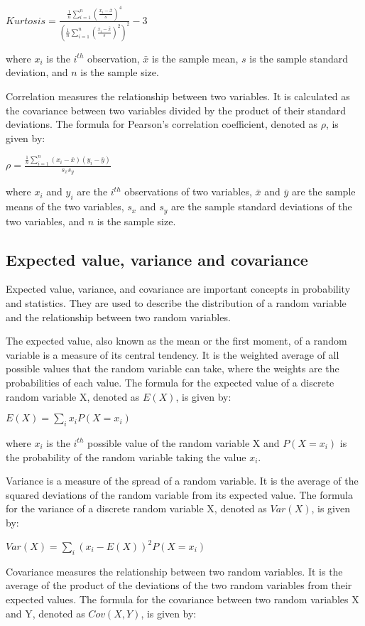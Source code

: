 \documentclass[12pt, a4paper, oneside]{article}
\begin{document}
$Kurtosis = \frac{\frac{1}{n} \sum_{i=1}^{n} (\frac{x_i - \bar{x}}{s})^4}{(\frac{1}{n} \sum_{i=1}^{n} (\frac{x_i - \bar{x}}{s})^2)^2} - 3$

where $x_i$ is the $i^{th}$ observation, $\bar{x}$ is the sample mean, $s$ is the sample standard deviation, and $n$ is the sample size.

Correlation measures the relationship between two variables. It is calculated as the covariance between two variables divided by the product of their standard deviations. The formula for Pearson's correlation coefficient, denoted as $\rho$, is given by:

$\rho = \frac{\frac{1}{n} \sum_{i=1}^{n} (x_i - \bar{x})(y_i - \bar{y})}{s_x s_y}$

where $x_i$ and $y_i$ are the $i^{th}$ observations of two variables, $\bar{x}$ and $\bar{y}$ are the sample means of the two variables, $s_x$ and $s_y$ are the sample standard deviations of the two variables, and $n$ is the sample size.
\subsection{ Expected value, variance and covariance }

Expected value, variance, and covariance are important concepts in probability and statistics. They are used to describe the distribution of a random variable and the relationship between two random variables.

The expected value, also known as the mean or the first moment, of a random variable is a measure of its central tendency. It is the weighted average of all possible values that the random variable can take, where the weights are the probabilities of each value. The formula for the expected value of a discrete random variable X, denoted as $E(X)$, is given by:

$E(X) = \sum_{i} x_i P(X = x_i)$

where $x_i$ is the $i^{th}$ possible value of the random variable X and $P(X = x_i)$ is the probability of the random variable taking the value $x_i$.

Variance is a measure of the spread of a random variable. It is the average of the squared deviations of the random variable from its expected value. The formula for the variance of a discrete random variable X, denoted as $Var(X)$, is given by:

$Var(X) = \sum_{i} (x_i - E(X))^2 P(X = x_i)$

Covariance measures the relationship between two random variables. It is the average of the product of the deviations of the two random variables from their expected values. The formula for the covariance between two random variables X and Y, denoted as $Cov(X, Y)$, is given by:
\end{document}
